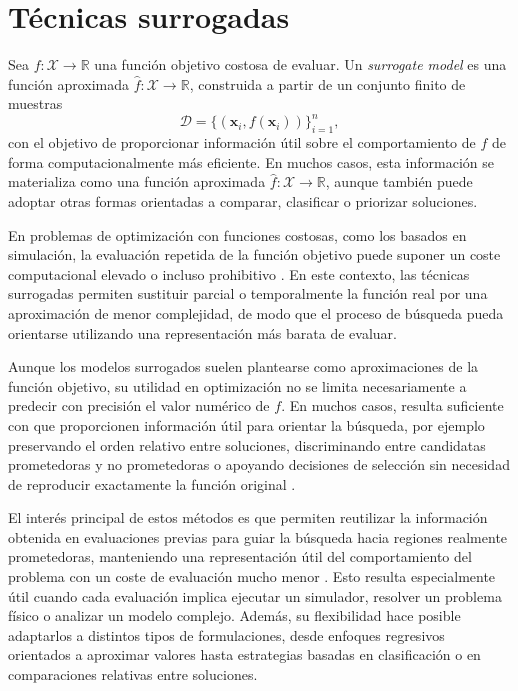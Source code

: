 
\section{Técnicas surrogadas}



\begin{definicion}
    Sea \(f:\mathcal{X}\rightarrow\mathbb{R}\) una función objetivo costosa de evaluar. Un \textit{surrogate model} es una función aproximada \(\hat{f}:\mathcal{X}\rightarrow\mathbb{R}\), construida a partir de un conjunto finito de muestras
    \[
        \mathcal{D}=\{(\mathbf{x}_i,f(\mathbf{x}_i))\}_{i=1}^{n},
    \]
    con el objetivo de proporcionar información útil sobre el comportamiento de \(f\) de forma computacionalmente más eficiente. En muchos casos, esta información se materializa como una función aproximada \(\hat{f}:\mathcal{X}\rightarrow\mathbb{R}\), aunque también puede adoptar otras formas orientadas a comparar, clasificar o priorizar soluciones.
\end{definicion}

En problemas de optimización con funciones costosas, como los basados en simulación, la evaluación repetida de la función objetivo puede suponer un coste computacional elevado o incluso prohibitivo \cite{queipo2005surrogate,forrester2009recent}. En este contexto, las técnicas surrogadas permiten sustituir parcial o temporalmente la función real por una aproximación de menor complejidad, de modo que el proceso de búsqueda pueda orientarse utilizando una representación más barata de evaluar.

Aunque los modelos surrogados suelen plantearse como aproximaciones de la función objetivo, su utilidad en optimización no se limita necesariamente a predecir con precisión el valor numérico de \(f\). En muchos casos, resulta suficiente con que proporcionen información útil para orientar la búsqueda, por ejemplo preservando el orden relativo entre soluciones, discriminando entre candidatas prometedoras y no prometedoras o apoyando decisiones de selección sin necesidad de reproducir exactamente la función original \cite{jin2011surrogate,tong2021surrogate}.

El interés principal de estos métodos es que permiten reutilizar la información obtenida en evaluaciones previas para guiar la búsqueda hacia regiones realmente prometedoras, manteniendo una representación útil del comportamiento del problema con un coste de evaluación mucho menor \cite{queipo2005surrogate,forrester2009recent,jin2011surrogate}. Esto resulta especialmente útil cuando cada evaluación implica ejecutar un simulador, resolver un problema físico o analizar un modelo complejo. Además, su flexibilidad hace posible adaptarlos a distintos tipos de formulaciones, desde enfoques regresivos orientados a aproximar valores hasta estrategias basadas en clasificación o en comparaciones relativas entre soluciones.

